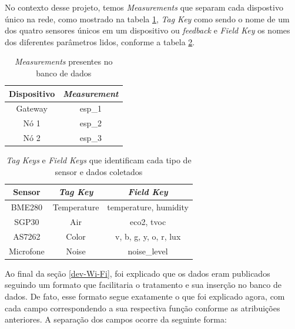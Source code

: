 \documentclass[../monografia.tex]{subfiles}
\begin{document}
No contexto desse projeto, temos \textit{Measurements} que separam cada dispostivo único na rede, como mostrado na tabela \ref{table:measurements}, \textit{Tag Key} como sendo o nome de um dos quatro sensores únicos em um dispositivo ou \textit{feedback} e \textit{Field Key} os nomes dos diferentes parâmetros lidos, conforme a tabela \ref{table:tag-field-keys}.


\begin{table}[h!]
	\centering
	\begin{tabular}{|c|c|}
	\hline
	\textbf{Dispositivo} & \textit{\textbf{Measurement}}  \\ \hline
	Gateway              & esp\_1                         \\ \hline
	Nó 1                 & esp\_2                         \\ \hline
	Nó 2                 & esp\_3                         \\ \hline 
	\end{tabular}
	\caption{\textit{Measurements} presentes no banco de dados}
	\label{table:measurements}
\end{table}

\begin{table}[h!]
	\centering
	\begin{tabular}{|c|c|c|}
		\hline
		\textbf{Sensor} & \textit{\textbf{Tag Key}} & \textit{\textbf{Field Key}} \\ \hline
		BME280          & Temperature               & temperature, humidity       \\ \hline
		SGP30           & Air                       & eco2, tvoc                  \\ \hline
		AS7262          & Color                     & v, b, g, y, o, r, lux       \\ \hline
		Microfone       & Noise                     & noise\_level                \\ \hline
	\end{tabular}
	\caption{\textit{Tag Keys} e \textit{Field Keys} que identificam cada tipo de sensor e dados coletados}
	\label{table:tag-field-keys}
\end{table}

Ao final da seção \ref{dev-Wi-Fi}, foi explicado que os dados eram publicados seguindo um formato que facilitaria o tratamento e sua inserção no banco de dados. De fato, esse formato segue exatamente o que foi explicado agora, com cada campo correspondendo a sua respectiva função conforme as atribuições anteriores. A separação dos campos ocorre da seguinte forma:
\end{document}
